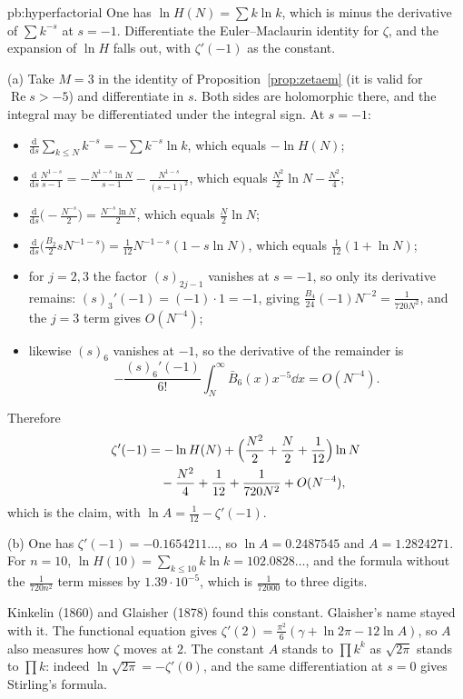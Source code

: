 \begin{solution}{pb:hyperfactorial}
\idea One has $\ln H(N)=\sum k\ln k$, which is minus the derivative of $\sum k^{-s}$ at $s=-1$. Differentiate the Euler--Maclaurin identity for $\zeta$, and the expansion of $\ln H$ falls out, with $\zeta'(-1)$ as
the constant.

\writeup (a) Take $M=3$ in the identity of Proposition~\ref{prop:zetaem} (it is valid for $\operatorname{Re}s>-5$) and differentiate in $s$. Both sides are holomorphic there, and the integral may be differentiated under the
integral sign. At $s=-1$:
\begin{itemize}
\item $\frac{\mathrm d}{\mathrm ds}\sum_{k\le N}k^{-s}=-\sum k^{-s}\ln k$, which equals $-\ln H(N)$;
\item $\frac{\mathrm d}{\mathrm ds}\frac{N^{1-s}}{s-1}=-\frac{N^{1-s}\ln N}{s-1}-\frac{N^{1-s}}{(s-1)^2}$, which equals $\frac{N^2}2\ln N-\frac{N^2}4$;
\item $\frac{\mathrm d}{\mathrm ds}\bigl(-\frac{N^{-s}}2\bigr)=\frac{N^{-s}\ln N}2$, which equals $\frac N2\ln N$;
\item $\frac{\mathrm d}{\mathrm ds}\bigl(\frac{B_2}2sN^{-1-s}\bigr)=\frac1{12}N^{-1-s}(1-s\ln N)$, which equals $\frac1{12}(1+\ln N)$;
\item for $j=2,3$ the factor $(s)_{2j-1}$ vanishes at $s=-1$, so only its derivative remains: $(s)_3'(-1)=(-1)\cdot1=-1$, giving $\frac{B_4}{24}(-1)N^{-2}=\frac1{720N^2}$, and the $j=3$ term gives
$O(N^{-4})$;
\item likewise $(s)_6$ vanishes at $-1$, so the derivative of the remainder is
\[
-\frac{(s)_6'(-1)}{6!}\int_N^\infty\bar B_6(x)x^{-5}\dd x=O(N^{-4}).
\]
\end{itemize}
Therefore
\[
\begin{aligned}\zeta'(-1)&=-\ln H(N)+\Bigl(\frac{N^2}2+\frac N2+\frac1{12}\Bigr)\ln N\\&\quad-\frac{N^2}4+\frac1{12}+\frac1{720N^2}+O(N^{-4}),\end{aligned}
\]
which is the claim, with $\ln A=\frac1{12}-\zeta'(-1)$.

(b) One has $\zeta'(-1)=-0.1654211\ldots$, so $\ln A=0.2487545$ and $A=1.2824271$. For $n=10$, $\ln H(10)=\sum_{k\le10}k\ln k=102.0828\ldots$, and the formula without the $\frac1{720n^2}$ term misses by $1.39\cdot10^{-5}$, which is $\frac1{72000}$ to
three digits.

\leads Kinkelin (1860) and Glaisher (1878) found this constant. Glaisher's name stayed with it. The functional equation gives $\zeta'(2)=\frac{\pi^2}6(\gamma+\ln2\pi-12\ln A)$, so $A$ also
measures how $\zeta$ moves at $2$. The constant $A$ stands to $\prod k^k$ as $\sqrt{2\pi}$ stands to $\prod k$: indeed $\ln\sqrt{2\pi}=-\zeta'(0)$, and the same differentiation at $s=0$ gives Stirling's formula.
\end{solution}

